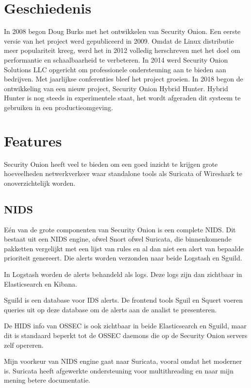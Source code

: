 \documentclass[a4paper,12pt]{report}
\begin{document}
\section{Geschiedenis}
In 2008 begon Doug Burks met het ontwikkelen van Security Onion.
Een eerste versie van het project werd gepubliceerd in 2009.
Omdat de Linux distributie meer populariteit kreeg, werd het in 2012 volledig herschreven met het doel om performantie en schaalbaarheid te verbeteren.
In 2014 werd Security Onion Solutions LLC opgericht om professionele ondersteuning aan te bieden aan bedrijven.
Met jaarlijkse conferenties bleef het project groeien.
\autocite{so:sos}
In 2018 begon de ontwikkeling van een nieuw project, Security Onion Hybrid Hunter.
Hybrid Hunter is nog steeds in experimentele staat, het wordt afgeraden dit systeem te gebruiken in een productieomgeving.

\section{Features}
Security Onion heeft veel te bieden om een goed inzicht te krijgen grote hoeveelheden netwerkverkeer waar standalone tools als Suricata of Wireshark te onoverzichtelijk worden.

\subsection{NIDS}
Eén van de grote componenten van Security Onion is een complete NIDS.
Dit bestaat uit een NIDS engine, ofwel Snort ofwel Suricata, die binnenkomende pakketten vergelijkt met een lijst van rules en al dan niet een alert van bepaalde prioriteit genereert.
Die alerts worden verzonden naar beide Logstash en Sguild.

In Logstash worden de alerts behandeld als logs.
Deze logs zijn dan zichtbaar in Elasticsearch en Kibana.

Sguild is een database voor IDS alerts.
De frontend tools Sguil en Squert voeren queries uit op deze database om de alerts aan de analist te presenteren.

De HIDS info van OSSEC is ook zichtbaar in beide Elasticsearch en Sguild, maar dit is standaard beperkt tot de OSSEC daemons die op de Security Onion servers zelf opereren.

Mijn voorkeur van NIDS engine gaat naar Suricata, vooral omdat het moderner is.
Suricata heeft afgewerkte ondersteuning voor multithreading en naar mijn mening betere documentatie.
\end{document}
